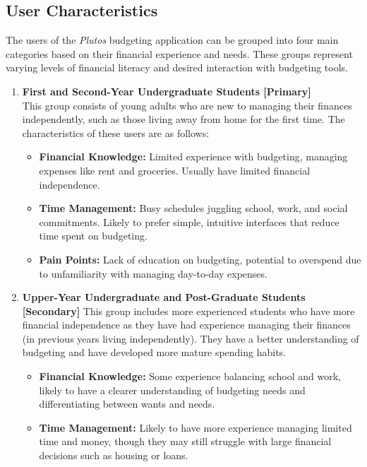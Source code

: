 \documentclass[12pt]{article}
\begin{document}
\subsection{User Characteristics} \label{SecUserCharacteristics}

The users of the \textit{Plutos} budgeting application can be grouped into four main categories based on their financial experience and needs. These groups represent varying levels of financial literacy and desired interaction with budgeting tools.

\begin{enumerate}
	\item \textbf{First and Second-Year Undergraduate Students [Primary]} \\ 
		This group consists of young adults who are new to managing their finances independently, such as those living away from home for the first time. The characteristics of these users are as follows:
		\begin{itemize}
			\item \textbf{Financial Knowledge:} Limited experience with budgeting, managing expenses like rent and groceries. Usually have limited financial independence.
			\item \textbf{Time Management:} Busy schedules juggling school, work, and social commitments. Likely to prefer simple, intuitive interfaces that reduce time spent on budgeting.
			\item \textbf{Pain Points:} Lack of education on budgeting, potential to overspend due to unfamiliarity with managing day-to-day expenses.
		\end{itemize}
	\item \textbf{Upper-Year Undergraduate and Post-Graduate Students [Secondary]}
		This group includes more experienced students who have more financial independence as they have had experience managing their finances (in previous years living independently).  They have a better understanding of budgeting and have developed more mature spending habits.
		\begin{itemize}
			\item \textbf{Financial Knowledge:}  Some experience balancing school and work, likely to have a clearer understanding of budgeting needs and differentiating between wants and needs.
			\item \textbf{Time Management:} Likely to have more experience managing limited time and money, though they may still struggle with large financial decisions such as housing or loans.

\end{itemize}
\end{enumerate}
\end{document}
